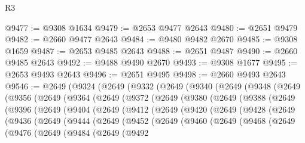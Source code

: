 \begin{lexlean}{R3}
\begin{coremodule}
@9477 := @9308 @1634
@9479 := @2653 @9477 @2643
@9480 := @2651 @9479
@9482 := @2660 @9477 @2643
@9484 := @9480 @9482 @2670
@9485 := @9308 @1659
@9487 := @2653 @9485 @2643
@9488 := @2651 @9487
@9490 := @2660 @9485 @2643
@9492 := @9488 @9490 @2670
@9493 := @9308 @1677
@9495 := @2653 @9493 @2643
@9496 := @2651 @9495
@9498 := @2660 @9493 @2643
@9546 := @2649
    (@9324
      (@2649
        (@9332
          (@2649
            (@9340
              (@2649
                (@9348
                  (@2649
                    (@9356
                      (@2649
                        (@9364
                          (@2649
                            (@9372
                              (@2649
                                (@9380
                                  (@2649
                                    (@9388
                                      (@2649
                                        (@9396
                                          (@2649
                                            (@9404
                                              (@2649
                                                (@9412
                                                  (@2649
                                                    (@9420
                                                      (@2649
                                                        (@9428
                                                          (@2649
                                                            (@9436
                                                              (@2649
                                                                (@9444
                                                                  (@2649
                                                                    (@9452
                                                                      (@2649
                                                                        (@9460
                                                                          (@2649
                                                                            (@9468
                                                                              (@2649
                                                                                (@9476
                                                                                  (@2649
                                                                                    (@9484
                                                                                      (@2649
                                                                                        (@9492

\end{coremodule}
\end{lexlean}
